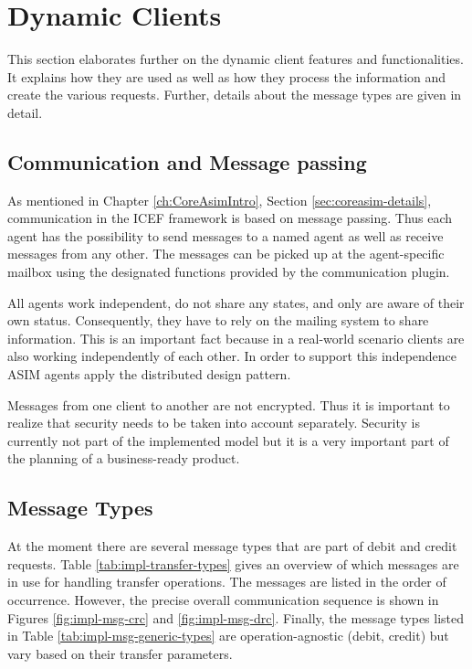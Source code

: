 \section{Dynamic Clients}
\label{sec:impl-dyn-clients}

This section elaborates further on the dynamic client features and functionalities. It explains how they are used as well as how they process the information and create the various requests. Further, details about the message types are given in detail.

\subsection{Communication and Message passing}
\label{sec:impl-com-msg}

As mentioned in Chapter \ref{ch:CoreAsimIntro}, Section \ref{sec:coreasim-details}, communication in the ICEF framework is based on message passing. Thus each agent has the possibility to send messages to a named agent as well as receive messages from any other. The messages can be picked up at the agent-specific mailbox using the designated functions provided by the communication plugin.

All agents work independent, do not share any states, and only are aware of their own status. Consequently, they have to rely on the mailing system to share information. This is an important fact because in a real-world scenario clients are also working independently of each other. In order to support this independence ASIM agents apply the distributed design pattern.

Messages from one client to another are not encrypted. Thus it is important to realize that security needs to be taken into account separately. Security is currently not part of the implemented model but it is a very important part of the planning of a business-ready product.

\subsection{Message Types}
\label{subsec:impl-msg-types}

At the moment there are several message types that are part of debit and credit requests. Table \ref{tab:impl-transfer-types} gives an overview of which messages are in use for handling transfer operations. The messages are listed in the order of occurrence. However, the precise overall communication sequence is shown in Figures \ref{fig:impl-msg-crc} and \ref{fig:impl-msg-drc}. Finally, the message types listed in Table \ref{tab:impl-msg-generic-types} are operation-agnostic (debit, credit) but vary based on their transfer parameters.

